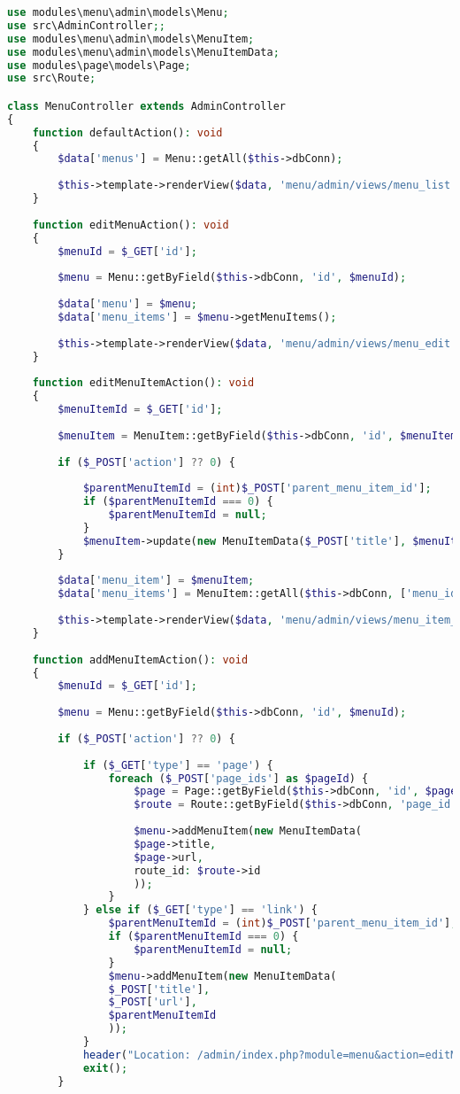 \begin{lstlisting}[language=PHP, frame=none]
use modules\menu\admin\models\Menu;
use src\AdminController;;
use modules\menu\admin\models\MenuItem;
use modules\menu\admin\models\MenuItemData;
use modules\page\models\Page;
use src\Route;

class MenuController extends AdminController
{
	function defaultAction(): void
	{
		$data['menus'] = Menu::getAll($this->dbConn);
		
		$this->template->renderView($data, 'menu/admin/views/menu_list');
	}
	
	function editMenuAction(): void
	{
		$menuId = $_GET['id'];
		
		$menu = Menu::getByField($this->dbConn, 'id', $menuId);
		
		$data['menu'] = $menu;
		$data['menu_items'] = $menu->getMenuItems();
		
		$this->template->renderView($data, 'menu/admin/views/menu_edit');
	}
	
	function editMenuItemAction(): void
	{
		$menuItemId = $_GET['id'];
		
		$menuItem = MenuItem::getByField($this->dbConn, 'id', $menuItemId);
		
		if ($_POST['action'] ?? 0) {
			
			$parentMenuItemId = (int)$_POST['parent_menu_item_id'];
			if ($parentMenuItemId === 0) {
				$parentMenuItemId = null;
			}
			$menuItem->update(new MenuItemData($_POST['title'], $menuItem->url, $parentMenuItemId));
		}
		
		$data['menu_item'] = $menuItem;
		$data['menu_items'] = MenuItem::getAll($this->dbConn, ['menu_id' => $menuItem->menu_id]);
		
		$this->template->renderView($data, 'menu/admin/views/menu_item_edit');
	}
	
	function addMenuItemAction(): void
	{
		$menuId = $_GET['id'];
		
		$menu = Menu::getByField($this->dbConn, 'id', $menuId);
		
		if ($_POST['action'] ?? 0) {
			
			if ($_GET['type'] == 'page') {
				foreach ($_POST['page_ids'] as $pageId) {
					$page = Page::getByField($this->dbConn, 'id', $pageId);
					$route = Route::getByField($this->dbConn, 'page_id', $pageId);
					
					$menu->addMenuItem(new MenuItemData(
					$page->title,
					$page->url,
					route_id: $route->id
					));
				}
			} else if ($_GET['type'] == 'link') {
				$parentMenuItemId = (int)$_POST['parent_menu_item_id'];
				if ($parentMenuItemId === 0) {
					$parentMenuItemId = null;
				}
				$menu->addMenuItem(new MenuItemData(
				$_POST['title'],
				$_POST['url'],
				$parentMenuItemId
				));
			}
			header("Location: /admin/index.php?module=menu&action=editMenu&id=$menuId");
			exit();
		}
		

\end{lstlisting}

